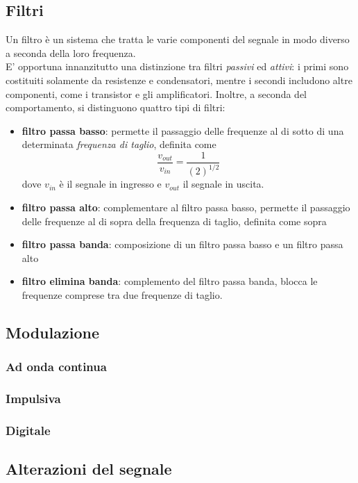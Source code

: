 \documentclass[a4paper,11pt]{paper}
\begin{document}
\subsection{Filtri}
Un filtro è un sistema che tratta le varie componenti del segnale in modo diverso a seconda della loro frequenza.
\\E' opportuna innanzitutto una distinzione tra filtri \textit{passivi} ed \textit{attivi}: i primi sono costituiti solamente da resistenze e condensatori, mentre i secondi includono altre componenti, come i transistor e gli amplificatori. Inoltre, a seconda del comportamento, si distinguono quattro tipi di filtri:
\begin{itemize}
\item \textbf{filtro passa basso}: permette il passaggio delle frequenze al di sotto di una determinata \textit{frequenza di taglio}, definita come \[\frac{v_{out}}{v_{in}}=\frac{1}{(2)^{1/2}}\]
dove $v_{in}$ è il segnale in ingresso e $v_{out}$ il segnale in uscita.
\item \textbf{filtro passa alto}: complementare al filtro passa basso, permette il passaggio delle frequenze al di sopra della frequenza di taglio, definita come sopra
\item \textbf{filtro passa banda}: composizione di un filtro passa basso e un filtro passa alto
\item \textbf{filtro elimina banda}: complemento del filtro passa banda, blocca le frequenze comprese tra due frequenze di taglio.
\end{itemize}

\subsection{Modulazione}
\subsubsection{Ad onda continua}
\subsubsection{Impulsiva}
\subsubsection{Digitale}

\subsection{Alterazioni del segnale}
\end{document}
